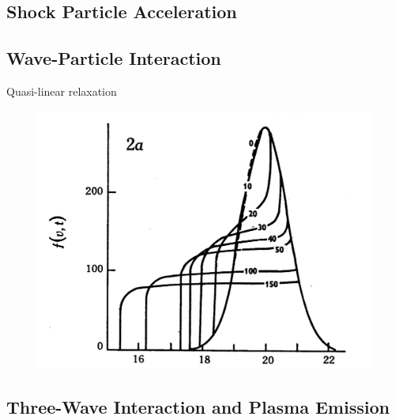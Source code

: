 \subsection{Shock Particle Acceleration}\label{sec:30}

\subsection{Wave-Particle Interaction}\label{sec:31}

Quasi-linear relaxation
\begin{figure}[!t]
\begin{center}
\includegraphics[scale=0.35, trim = 4cm 0cm 0cm 0cm]{images/Grognard1975}
\end{center}
\end{figure}


\subsection{Three-Wave Interaction and Plasma Emission}\label{sec:32}

